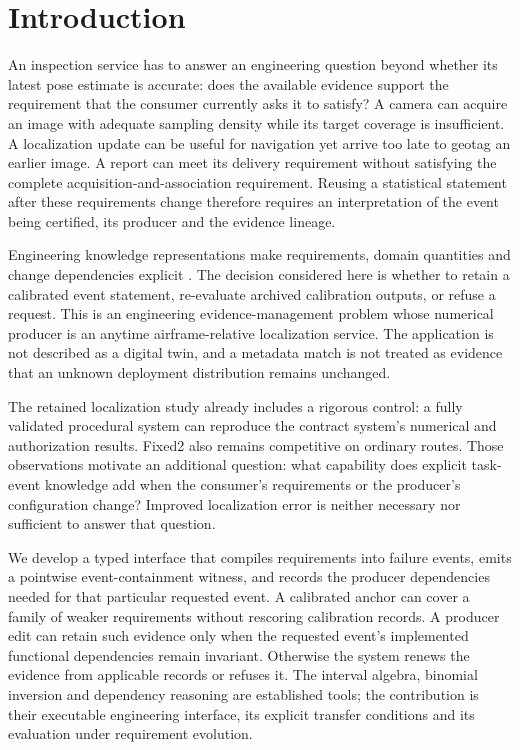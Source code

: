 \section{Introduction}\label{sec:r9-intro}
An inspection service has to answer an engineering question beyond whether its latest pose estimate is accurate: does the available evidence support the requirement that the consumer currently asks it to satisfy? A camera can acquire an image with adequate sampling density while its target coverage is insufficient. A localization update can be useful for navigation yet arrive too late to geotag an earlier image. A report can meet its delivery requirement without satisfying the complete acquisition-and-association requirement. Reusing a statistical statement after these requirements change therefore requires an interpretation of the event being certified, its producer and the evidence lineage.

Engineering knowledge representations make requirements, domain quantities and change dependencies explicit \cite{petnga2016,wang2018change,ma2023inspection}. The decision considered here is whether to retain a calibrated event statement, re-evaluate archived calibration outputs, or refuse a request. This is an engineering evidence-management problem whose numerical producer is an anytime airframe-relative localization service. The application is not described as a digital twin, and a metadata match is not treated as evidence that an unknown deployment distribution remains unchanged.

The retained localization study already includes a rigorous control: a fully validated procedural system can reproduce the contract system's numerical and authorization results. Fixed2 also remains competitive on ordinary routes. Those observations motivate an additional question: what capability does explicit task-event knowledge add when the consumer's requirements or the producer's configuration change? Improved localization error is neither necessary nor sufficient to answer that question.

We develop a typed interface that compiles requirements into failure events, emits a pointwise event-containment witness, and records the producer dependencies needed for that particular requested event. A calibrated anchor can cover a family of weaker requirements without rescoring calibration records. A producer edit can retain such evidence only when the requested event's implemented functional dependencies remain invariant. Otherwise the system renews the evidence from applicable records or refuses it. The interval algebra, binomial inversion and dependency reasoning are established tools; the contribution is their executable engineering interface, its explicit transfer conditions and its evaluation under requirement evolution.

